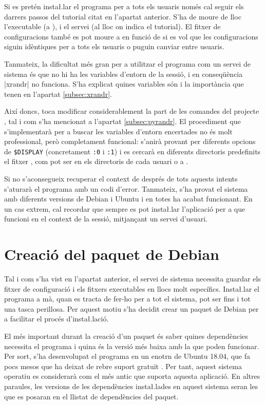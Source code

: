 Si es pretén insta\l.lar el programa per a tots els usuaris només cal seguir
els darrers passos del tutorial citat en l'apartat anterior. S'ha de moure de
lloc l'executable (a ), i el servei (al lloc on indica el
tutorial). El fitxer de configuracions també es pot moure a  en funció
de si es vol que les configuracions siguin idèntiques per a tots els usuaris o
puguin canviar entre usuaris.

Tanmateix, la dificultat més gran per a utilitzar el programa com un servei de
sistema és que no hi ha les variables d'entorn de la sessió, i en conseqüència
\ord|xrandr| no funciona. S'ha explicat quines variables són i la importància
que tenen en l'apartat \ref{subsec:xrandr}.

Així doncs, toca modificar considerablement la part de les comandes del
projecte , tal i com s'ha mencionat a l'apartat \ref{subsec:pyrandr}.
El procediment que s'implementarà per a buscar les variables d'entorn encertades
no és molt professional, però completament funcional: s'anirà provant per diferents
opcions de \verb|$DISPLAY| (concretament \verb|:0| i \verb|:1|) i es cercarà
en diferents directoris predefinits el fitxer , com pot ser
en els directoris de cada usuari o a .

Si no s'aconsegueix recuperar el context de  després de tots aquests
intents s'aturarà el programa amb un codi d'error. Tanmateix, s'ha provat el
sistema amb diferents versions de Debian i Ubuntu i en totes ha acabat funcionant.
En un cas extrem, cal recordar que sempre es pot insta\l.lar l'aplicació per a
que funcioni en el context de la sessió, mitjançant un servei d'usuari.

\section{Creació del paquet de Debian}

Tal i com s'ha vist en l'apartat anterior, el servei de sistema necessita guardar
els fitxer de configuració i els fitxers executables en llocs molt específics.
Insta\l.lar el programa a mà, quan es tracta de fer-ho per a tot el sistema,
pot ser fins i tot una tasca perillosa. Per aquest motiu s'ha decidit crear un
paquet de Debian per a facilitar el procés d'insta\l.lació.

El més important durant la creació d'un paquet és saber quines dependències
necessita el programa i quina és la versió més baixa amb la que poden funcionar.
Per sort, s'ha desenvolupat el programa en un enotrn de Ubuntu 18.04, que fa
pocs mesos que ha deixat de rebre suport gratuït \cite{UbuntuSupport}. Per tant,
aquest sistema
operatiu es considerarà com el més antic que suporta aquesta aplicació. En altres
paraules, les versions de les dependències insta\l.lades en aquest sistema seran
les que es posaran en el llistat de dependències del paquet.

